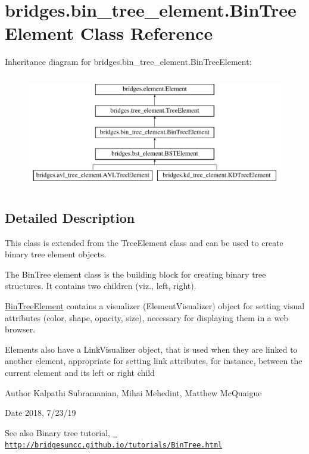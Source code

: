 \hypertarget{classbridges_1_1bin__tree__element_1_1_bin_tree_element}{}\section{bridges.\+bin\+\_\+tree\+\_\+element.\+Bin\+Tree\+Element Class Reference}
\label{classbridges_1_1bin__tree__element_1_1_bin_tree_element}
Inheritance diagram for bridges.\+bin\+\_\+tree\+\_\+element.\+Bin\+Tree\+Element\+:\begin{figure}[H]
\begin{center}
\leavevmode
\includegraphics[height=5.000000cm]{classbridges_1_1bin__tree__element_1_1_bin_tree_element}
\end{center}
\end{figure}


\subsection{Detailed Description}
This class is extended from the Tree\+Element class and can be used to create binary tree element objects. 

The Bin\+Tree element class is the building block for creating binary tree structures. It contains two children (viz., left, right).

\mbox{\hyperlink{classbridges_1_1bin__tree__element_1_1_bin_tree_element}{Bin\+Tree\+Element}} contains a visualizer (Element\+Visualizer) object for setting visual attributes (color, shape, opacity, size), necessary for displaying them in a web browser.

Elements also have a Link\+Visualizer object, that is used when they are linked to another element, appropriate for setting link attributes, for instance, between the current element and its left or right child

\begin{DoxyAuthor}{Author}
Kalpathi Subramanian, Mihai Mehedint, Matthew Mc\+Quaigue
\end{DoxyAuthor}
\begin{DoxyDate}{Date}
2018, 7/23/19
\end{DoxyDate}
\begin{DoxySeeAlso}{See also}
Binary tree tutorial, \href{http://bridgesuncc.github.io/tutorials/BinTree.html}{\texttt{ http\+://bridgesuncc.\+github.\+io/tutorials/\+Bin\+Tree.\+html}} 
\end{DoxySeeAlso}
